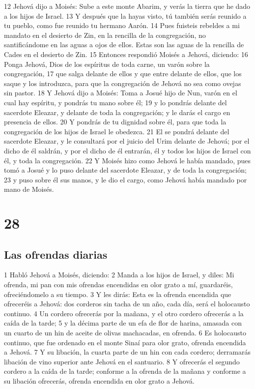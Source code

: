 12 Jehová dijo a Moisés: Sube a este monte Abarim, y verás la tierra que he dado a los hijos de Israel.
13 Y después que la hayas visto, tú también serás reunido a tu pueblo, como fue reunido tu hermano Aarón.
14 Pues fuisteis rebeldes a mi mandato en el desierto de Zin, en la rencilla de la congregación, no santificándome en las aguas a ojos de ellos. Estas son las aguas de la rencilla de Cades en el desierto de Zin.
15 Entonces respondió Moisés a Jehová, diciendo:
16 Ponga Jehová, Dios de los espíritus de toda carne, un varón sobre la congregación,
17 que salga delante de ellos y que entre delante de ellos, que los saque y los introduzca, para que la congregación de Jehová no sea como ovejas sin pastor.
18 Y Jehová dijo a Moisés: Toma a Josué hijo de Nun, varón en el cual hay espíritu, y pondrás tu mano sobre él;
19 y lo pondrás delante del sacerdote Eleazar, y delante de toda la congregación; y le darás el cargo en presencia de ellos.
20 Y pondrás de tu dignidad sobre él, para que toda la congregación de los hijos de Israel le obedezca.
21 El se pondrá delante del sacerdote Eleazar, y le consultará por el juicio del Urim  delante de Jehová; por el dicho de él saldrán, y por el dicho de él entrarán, él y todos los hijos de Israel con él, y toda la congregación.
22 Y Moisés hizo como Jehová le había mandado, pues tomó a Josué y lo puso delante del sacerdote Eleazar, y de toda la congregación;
23 y puso sobre él sus manos, y le dio el cargo, como Jehová había mandado por mano de Moisés.

\chapter{28}

\section*{Las ofrendas diarias }


1 Habló Jehová a Moisés, diciendo: 
2 Manda a los hijos de Israel, y diles: Mi ofrenda, mi pan con mis ofrendas encendidas en olor grato a mí, guardaréis, ofreciéndomelo a su tiempo.
3 Y les dirás: Esta es la ofrenda encendida que ofreceréis a Jehová: dos corderos sin tacha de un año, cada día, será el holocausto continuo.
4 Un cordero ofrecerás por la mañana, y el otro cordero ofrecerás a la caída de la tarde;
5 y la décima parte de un efa   de flor de harina, amasada con un cuarto de un hin de aceite de olivas machacadas, en ofrenda.
6 Es holocausto continuo, que fue ordenado en el monte Sinaí para olor grato, ofrenda encendida a Jehová.
7 Y su libación, la cuarta parte de un hin   con cada cordero; derramarás libación de vino superior ante Jehová en el santuario.
8 Y ofrecerás el segundo cordero a la caída de la tarde; conforme a la ofrenda de la mañana y conforme a su libación ofrecerás, ofrenda encendida en olor grato a Jehová.
